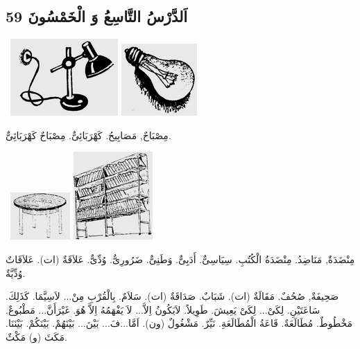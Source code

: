 \documentclass[a5paper]{article}
\begin{document}
\subsection{اَلدَّرْسُ التَّاسِعُ وَ الْخَمْسُونَ 59}
\  \includegraphics[width=1.6146in,height=1.1563in]{images/MuhammadBagauddinprettified-img192.png}   \includegraphics[width=1.1354in,height=1.0835in]{images/MuhammadBagauddinprettified-img193.png} 

مِصْبَاحٌ, مَصَابِيحُ. كَهْرَبَائِىٌّ. مِصْبَاحٌ كَهْرَبَائِىٌّ. 

\  \includegraphics[width=0.8957in,height=0.7083in]{images/MuhammadBagauddinprettified-img194.png}   \includegraphics[width=1.1874in,height=1.3228in]{images/MuhammadBagauddinprettified-img195.png} 

مِنْضَدَةٌ, مَنَاضِدُ. مِنْضَدَةُ الْكُتُبِ. سِيَاسِىٌّ. أَدَبِىٌّ. وَطَنِىٌّ. ضَرُورِىٌّ. وُدِّىٌّ. عَلاَقَةٌ (ات). عَلاَقَاتٌ وُدِّيَّةٌ. 

صَحِيفَةٌ, صُحُفٌ. مَقَالَةٌ (ات). شَبَابٌ. صَدَاقَةٌ (ات). سَلاَمٌ. بِالْقُرْبِ مِنْ... لاَسِيَّمَا. كَذَلِكَ. سَاعَتَيْنِ. لِكَىْ... لِكَىْ يَعِيشَ. طَوِيلاً. لاَيَكُونُ اِلاَّ... لاَ يَفْهَمُهُ اِلاَّ هُوَ. غَيْرَأَنَّ... مَطْبُوعٌ. مَخْطُوطٌ. مُطَالَعَةٌ. قَاعَةُ الْمُطَالَعَةِ. نَيِّرٌ. مَشْغُولٌ (ون). اَمَّا...فَ... بَيْنَ... بَيْنَهُمْ. بَيْنَكُمْ. بَيْنَنَا. مَكَثَ (و) مَكْثٌ.
\end{document}
